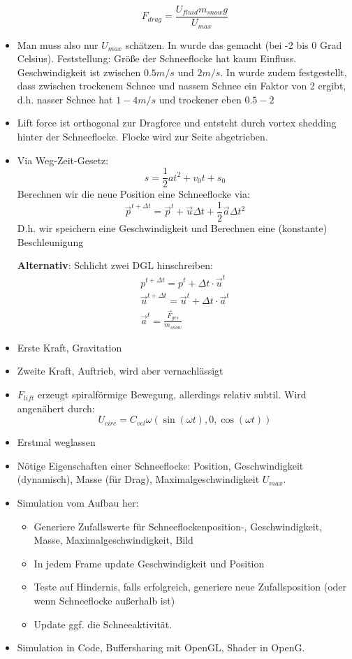 \begin{itemize}
\[
F_{drag} = \frac{U_{fluid} m_{snow} g}{U_{max}}
\]
\item Man muss also nur $U_{max}$ schätzen. In \cite{Hanesch1966} wurde das
gemacht (bei -2 bis 0 Grad Celsius). Feststellung: Größe der Schneeflocke hat
kaum Einfluss. Geschwindigkeit ist zwischen $0.5m/s$ und $2m/s$. In
\cite{Canada1999} wurde zudem festgestellt, dass zwischen trockenem Schnee und
nassem Schnee ein Faktor von 2 ergibt, d.h. nasser Schnee hat $1-4m/s$ und
trockener eben $0.5-2$
\item Lift force ist orthogonal zur Dragforce und entsteht durch vortex shedding
hinter der Schneeflocke. Flocke wird zur Seite abgetrieben.
\item Via Weg-Zeit-Gesetz:
\[
s=\frac{1}{2}at^2 + v_0 t + s_0
\]
Berechnen wir die neue Position eine Schneeflocke via:
\[
\vec{p}^{t+\Delta t} = \vec{p}^t + \vec{u} \Delta t + \frac{1}{2} \vec{a} \Delta t^2
\]
D.h. wir speichern eine Geschwindigkeit und Berechnen eine (konstante) Beschleunigung

\textbf{Alternativ}: Schlicht zwei DGL hinschreiben:
\begin{gather}
p^{t + \Delta t} = p^{t} + \Delta t \cdot \vec{u}^{t} \\
\vec{u}^{t+ \Delta t} = \vec{u}^{t} + \Delta t \cdot \vec{a}^{t} \\
\vec{a}^t = \frac{\vec{F}_{ges}}{m_{snow}}
\end{gather}
\item Erste Kraft, Gravitation
\item Zweite Kraft, Auftrieb, wird aber vernachlässigt
\item $F_{lift}$ erzeugt spiralförmige Bewegung, allerdings relativ subtil. Wird angenähert durch:
\[
U_{circ} = C_{vel} \omega (\sin(\omega t),0,\cos(\omega t))
\]
\item Erstmal weglassen
\item Nötige Eigenschaften einer Schneeflocke: Position, Geschwindigkeit (dynamisch), Masse (für Drag), Maximalgeschwindigkeit $U_{max}$.
\item Simulation vom Aufbau her:
	\begin{itemize}
		\item Generiere Zufallswerte für Schneeflockenposition-,
		Geschwindigkeit, Masse, Maximalgeschwindigkeit, Bild
		\item In jedem Frame update Geschwindigkeit und Position
		\item Teste auf Hindernis, falls erfolgreich, generiere neue
		Zufallsposition (oder wenn Schneeflocke außerhalb ist)
		\item Update ggf. die Schneeaktivität.
	\end{itemize}
\item Simulation in Code, Buffersharing mit OpenGL, Shader in OpenG.
\end{itemize}

